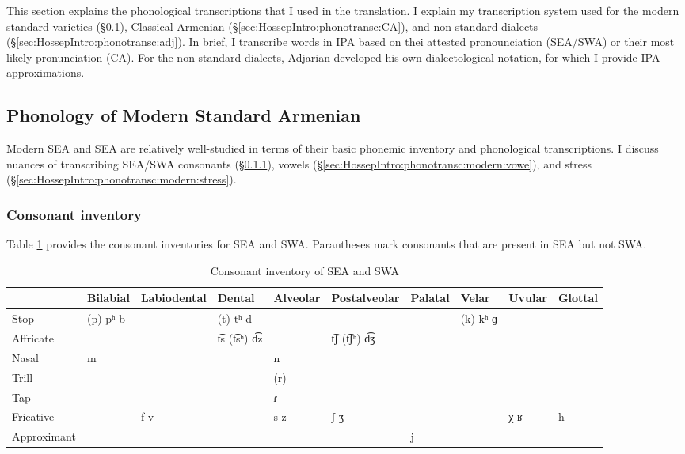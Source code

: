 This section explains the phonological transcriptions that I used in the translation. I explain my transcription system used for the modern standard varieties (\S\ref{sec:HossepIntro:phonotransc:modern}), Classical Armenian (\S\ref{sec:HossepIntro:phonotransc:CA}),  and non-standard dialects (\S\ref{sec:HossepIntro:phonotransc:adj}). In brief, I transcribe words in IPA based on thei attested pronounciation (SEA/SWA)  or their most likely pronunciation (CA). For the non-standard dialects, Adjarian developed his own dialectological notation, for which I provide IPA approximations. 
\subsection{Phonology of Modern Standard Armenian}\label{sec:HossepIntro:phonotransc:modern}

Modern SEA and SEA are relatively well-studied in terms of their basic phonemic inventory and phonological transcriptions. I discuss nuances of transcribing SEA/SWA consonants (\S\ref{sec:HossepIntro:phonotransc:modern:cons}), vowels (\S\ref{sec:HossepIntro:phonotransc:modern:vowe}),  and stress (\S\ref{sec:HossepIntro:phonotransc:modern:stress}). 
\subsubsection{Consonant inventory}\label{sec:HossepIntro:phonotransc:modern:cons}
Table \ref{fig:HossepIntro:consSEA} provides the consonant inventories for SEA and SWA. Parantheses mark consonants that are present in SEA but not SWA. 

\begin{table}[H]
	\caption{Consonant inventory of SEA and SWA}\label{fig:HossepIntro:consSEA}
	\begin{tabular}{| l| lllllllll| }
			\hline 	& Bilabial & Labiodental & Dental & Alveolar & Postalveolar & Palatal & Velar & Uvular & Glottal \\
			\hline 	Stop & (p) pʰ b & & (t) tʰ d & & & & (k) kʰ ɡ & & \\
		Affricate & & & t͡s (t͡sʰ) d͡z & & t͡ʃ (t͡ʃʰ) d͡ʒ & & & & \\
		Nasal & m & & & n & & & & & \\
		Trill & & & & (r) & & & & & \\
		Tap & & & & ɾ & & & & & \\
		Fricative & & f v & & s z & ʃ ʒ & & & χ ʁ & h \\
		Approximant & & & & & & j & & & \\
		\hline 
	\end{tabular}
\end{table}

